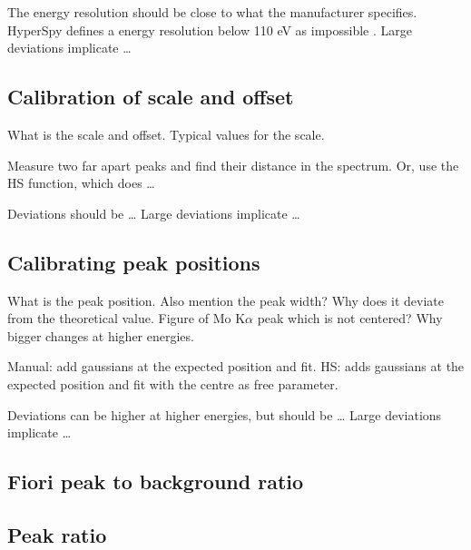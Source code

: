 The energy resolution should be close to what the manufacturer specifies.
HyperSpy defines a energy resolution below 110 eV as impossible .
Large deviations implicate \dots


\subsection{Calibration of scale and offset}
\label{theory:qc:scaleoffset}

What is the scale and offset.
Typical values for the scale.

Measure two far apart peaks and find their distance in the spectrum.
Or, use the HS function, which does \dots

Deviations should be \dots
Large deviations implicate \dots


\subsection{Calibrating peak positions}
\label{theory:qc:peakpositions}

What is the peak position.
Also mention the peak width?
Why does it deviate from the theoretical value.
Figure of Mo K$\alpha$ peak which is not centered?
Why bigger changes at higher energies.

Manual: add gaussians at the expected position and fit.
HS: adds gaussians at the expected position and fit with the centre as free parameter.

Deviations can be higher at higher energies, but should be \dots
Large deviations implicate \dots



\subsection{Fiori peak to background ratio}
\label{theory:qc:fiori}


\subsection{Peak ratio}
\label{theory:qc:peakratio}

